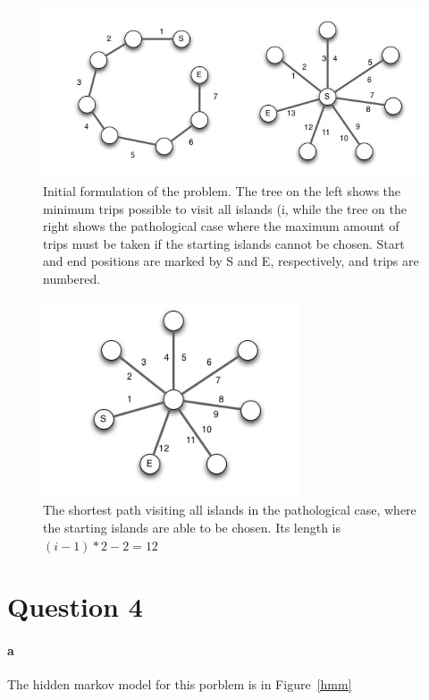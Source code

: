 \documentclass[12pt]{article}
\begin{document}
\begin{figure}[htb]
	\begin{center}
		\includegraphics[width=4.5in]{twographs.jpg}
	\end{center}
	\caption{Initial formulation of the problem.  The tree on the left shows the minimum trips possible to visit all islands (i, while the tree on the right shows the pathological case where the maximum amount of trips must be taken if the starting islands cannot be chosen.  Start and end positions are marked by S and E, respectively, and trips are numbered.}
	\label{twographs}
\end{figure}


\begin{figure}[htb]
	\begin{center}
		\includegraphics[width=3in]{onegraph.jpg}
	\end{center}
	\caption{The shortest path visiting all islands in the pathological case, where the starting islands are able to be chosen.  Its length is $(i-1)*2 - 2 = 12$}
	\label{onegraph}
\end{figure}

\clearpage

\section*{Question 4}
\paragraph{a}  The hidden markov model for this porblem is in Figure~\ref{hmm}
\end{document}
